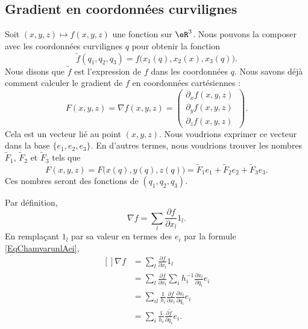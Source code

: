 \subsection{Gradient en coordonnées curvilignes}

Soit $(x,y,z)\mapsto f(x,y,z)$ une fonction sur $\eR^3$. Nous pouvons la composer avec les coordonnées curvilignes $q$ pour obtenir la fonction
\begin{equation}
    \tilde f(q_1,q_2,q_3)=f\big( x_1(q),x_2(x),x_3(q) \big).
\end{equation}
Nous disons que $\tilde f$ est l'expression de $f$ dans les coordonnées $q$. Nous savons déjà comment calculer le gradient de $f$ en coordonnées cartésiennes :
\begin{equation}
    F(x,y, z)=\nabla f(x,y,z)=\begin{pmatrix}
        \partial_xf(x,y,z)    \\ 
        \partial_yf(x,y,z)    \\ 
        \partial_zf(x,y,z)    \
    \end{pmatrix}.
\end{equation}
Cela est un vecteur lié au point $(x,y,z)$. Nous voudrions exprimer ce vecteur dans la base $\{ e_1,e_2,e_3 \}$. En d'autres termes, nous voudrions trouver les nombres $\tilde F_1$, $\tilde F_2$ et $\tilde F_3$ tels que
\begin{equation}
    F(x,y,z)=F\big( x(q),y(q),z(q) \big)=\tilde F_1e_1+\tilde F_2e_2+\tilde F_3e_3.
\end{equation}
Ces nombres seront des fonctions de $(q_1,q_2,q_3)$.

Par définition,
\begin{equation}
    \nabla f=\sum_l\frac{ \partial f }{ \partial x_l }1_l.
\end{equation}
En remplaçant $1_l$ par sa valeur en termes des $e_i$ par la formule \eqref{EqChamvarunlAei},
\begin{equation}
    \begin{aligned}[]
        \nabla f&=\sum_l\frac{ \partial f }{ \partial x_l }1_l\\
        &=\sum_l\frac{ \partial f }{ \partial x_l }\sum_ih_i^{-1}\frac{ \partial x_l }{ \partial q_i }e_i\\
        &=\sum_{il}\frac{1}{ h_i }\frac{ \partial f }{ \partial x_l }\frac{ \partial x_l }{ \partial q_i }e_i\\
        &=\sum_i\frac{1}{ h_i }\frac{ \partial \tilde f }{ \partial q_i }e_i.
    \end{aligned}
\end{equation}

